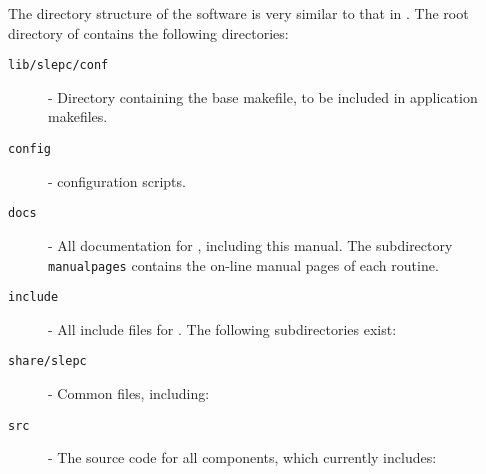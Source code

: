 	The directory structure of the \slepc software is very similar to that in \petsc. The root directory of \slepc contains the following directories:
\begin{description}
\item[\texttt{lib/slepc/conf}] - Directory containing the base \slepc makefile, to be included in application makefiles.
\item[\texttt{config}] - \slepc configuration scripts.
\item[\texttt{docs}] - All documentation for \slepc, including this manual. The subdirectory \texttt{manualpages} contains the on-line manual pages of each \slepc routine.
\item[\texttt{include}] - All include files for \slepc. The following subdirectories exist:
\item[\texttt{share/slepc}] - Common files, including:
\item[\texttt{src}] - The source code for all \slepc components, which currently includes:

\end{description}
